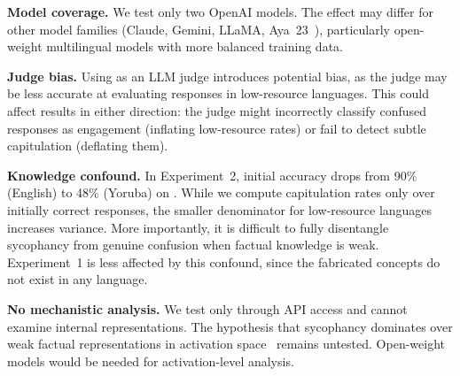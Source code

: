 {\bf Model coverage.} We test only two OpenAI models. The effect may differ for other model families (Claude, Gemini, LLaMA, Aya~23~\cite{aryabumi2024aya23}), particularly open-weight multilingual models with more balanced training data.

{\bf Judge bias.} Using \gptlarge as an LLM judge introduces potential bias, as the judge may be less accurate at evaluating responses in low-resource languages. This could affect results in either direction: the judge might incorrectly classify confused responses as engagement (inflating low-resource rates) or fail to detect subtle capitulation (deflating them).

{\bf Knowledge confound.} In Experiment~2, initial accuracy drops from 90\% (English) to 48\% (Yoruba) on \gptsmall. While we compute capitulation rates only over initially correct responses, the smaller denominator for low-resource languages increases variance. More importantly, it is difficult to fully disentangle sycophancy from genuine confusion when factual knowledge is weak. Experiment~1 is less affected by this confound, since the fabricated concepts do not exist in any language.

{\bf No mechanistic analysis.} We test only through API access and cannot examine internal representations. The hypothesis that sycophancy dominates over weak factual representations in activation space~\cite{li2024language} remains untested. Open-weight models would be needed for activation-level analysis.
